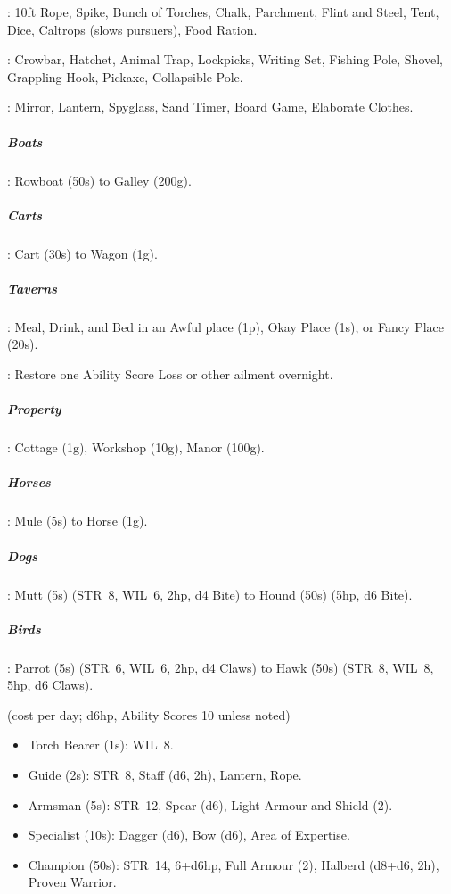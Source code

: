 \documentclass[itdr]{subfiles}
\begin{document}
: 10ft Rope, Spike, Bunch of Torches, Chalk, Parchment, Flint and Steel, Tent, Dice, Caltrops (slows pursuers), Food Ration.

: Crowbar, Hatchet, Animal Trap, Lockpicks, Writing Set, Fishing Pole, Shovel, Grappling Hook, Pickaxe, Collapsible Pole.

: Mirror, Lantern, Spyglass, Sand Timer, Board Game, Elaborate Clothes.


\subparagraph{Boats}: Rowboat (50s) to Galley (200g).
	
\subparagraph{Carts}: Cart (30s) to Wagon (1g).

\subparagraph{Taverns}: Meal, Drink, and Bed in an Awful place (1p), Okay Place (1s), or Fancy Place (20s).

: Restore one Ability Score Loss or other ailment overnight.

\subparagraph{Property}: Cottage (1g), Workshop (10g), Manor (100g).

\subparagraph{Horses}: Mule (5s) to Horse (1g).

\subparagraph{Dogs}: Mutt (5s) (STR~8, WIL~6, 2hp, d4 Bite) to Hound (50s) (5hp, d6 Bite).

\subparagraph{Birds}: Parrot (5s) (STR~6, WIL~6, 2hp, d4 Claws) to Hawk (50s) (STR~8, WIL~8, 5hp, d6 Claws).

 (cost per day; d6hp, Ability Scores 10
unless noted)
\begin{itemize}
	\item Torch Bearer (1s): WIL~8.
	\item Guide (2s): STR~8, Staff (d6, 2h), Lantern, Rope.
	\item Armsman (5s): STR~12, Spear (d6), Light Armour and Shield (2).
	\item Specialist (10s): Dagger (d6), Bow (d6), Area of Expertise.
	\item Champion (50s): STR~14, 6+d6hp, Full Armour (2), Halberd (d8+d6, 2h), Proven Warrior.
\end{itemize}

\break

\end{document}
